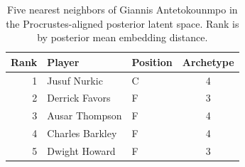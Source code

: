 \begin{table}[htbp]
  \centering\small
  \begin{tabular}{rllc}
    \toprule
    Rank & Player & Position & Archetype \\
    \midrule
    1 & Jusuf Nurkic & C & 4 \\
    2 & Derrick Favors & F & 3 \\
    3 & Ausar Thompson & F & 4 \\
    4 & Charles Barkley & F & 4 \\
    5 & Dwight Howard & F & 3 \\
    \bottomrule
  \end{tabular}
  \caption{Five nearest neighbors of Giannis Antetokounmpo in the Procrustes-aligned posterior latent space. Rank is by posterior mean embedding distance.}
  \label{tab:Giannis_Antetokounmpo_neighbors}
\end{table}

